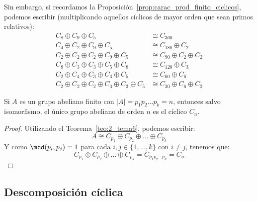 \noindent
Sin embargo, si recordamos la Proposición~\ref{prop:carac_prod_finito_ciclicos}, podemos escribir (multiplicando aquellos cíclicos de mayor orden que sean primos relativos):
\begin{align*}
    C_8\oplus C_9 \oplus C_5 &\cong C_{360} \\
    C_4\oplus C_2 \oplus C_9 \oplus C_5 &\cong C_{180} \oplus C_2 \\
    C_2 \oplus C_2 \oplus C_2 \oplus C_9 \oplus C_5 &\cong C_{90} \oplus C_2 \oplus C_2 \\
    C_8\oplus C_3 \oplus C_3 \oplus C_5 \oplus C_8 &\cong C_{120} \oplus C_3 \\
    C_2 \oplus C_4 \oplus C_3 \oplus C_3 \oplus C_5 &\cong C_{60} \oplus C_6 \\
    C_2 \oplus C_2 \oplus C_2 \oplus C_3 \oplus C_3 \oplus C_5 &\cong C_{30} \oplus C_6 \oplus C_2
\end{align*}

\begin{coro}
    Si $A$ es un grupo abeliano finito con $|A| = p_1p_2 \ldots p_k = n$, entonces salvo isomorfismo, el único grupo abeliano de orden $n$ es el cíclico $C_n$.
    \begin{proof}
        Utilizando el Teorema~\ref{teo:2_tema6}, podemos escribir:
        \begin{equation*}
            A \cong C_{p_1} \oplus C_{p_2} \oplus \ldots \oplus C_{p_k}
        \end{equation*}
        Y como $\mcd(p_i, p_j) = 1$ para cada $i,j\in \{1,\ldots,k\}$ con $i\neq j$, tenemos que:
        \begin{equation*}
            C_{p_1} \oplus C_{p_2} \oplus \ldots \oplus C_{p_k} = C_{p_1p_2\ldots p_k} = C_n
        \end{equation*}
    \end{proof}
\end{coro}

\subsection{Descomposición cíclica}

